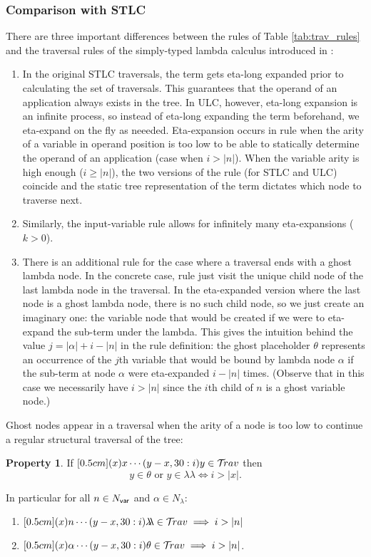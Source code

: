 \documentclass{article}
\theoremstyle{definition}
\newtheorem{property}{Property}[section]
\newcommand\NodesVar{N_{\sf var}}%
\newcommand\NodesLmd{N_\lambda}%
\newcommand{\ghostlmd}{{\lambda\!\!\lambda}}
\newcommand{\ghostvar}{\theta}
\begin{document}
\subsubsection{Comparison with STLC}
There are three important differences between the rules of Table \ref{tab:trav_rules} and the traversal rules of the simply-typed lambda calculus introduced in \cite{Blum2006}:
\begin{enumerate}
  \item In the original STLC traversals, the term gets eta-long expanded prior to calculating the set of traversals. This guarantees that the operand of an application always exists in the tree. In ULC, however, eta-long expansion is an infinite process, so instead of eta-long expanding the term beforehand, we eta-expand on the fly as neeeded. Eta-expansion occurs in rule  when the arity of a variable in operand position is too low to be able to statically determine the operand of an application (case when $i>|n|$). When the variable arity is high enough ($i\geq|n|$), the two versions of the rule (for STLC and ULC) coincide and the static tree representation of the term dictates which node to traverse next.

  \item Similarly, the input-variable rule allows for infinitely many eta-expansions ($k>0$).

  \item There is an additional rule \rulenamet{Lam^\ghostlmd} for the case where a traversal ends with a ghost lambda node. In the concrete case, rule  just visit the unique child node of the last lambda node in the traversal. In the eta-expanded version where the last node is a ghost lambda node, there is no such child node, so we just create an imaginary one: the variable node that would be created if we were to eta-expand the sub-term under the lambda.
      This gives the intuition behind the value $j = |\alpha| + i - |n|$ in the rule definition: the ghost placeholder $\ghostvar$ represents an occurrence of the $j$th variable that would be bound by lambda node $\alpha$ if the sub-term at node $\alpha$ were eta-expanded $i-|n|$ times.
  (Observe that in this case we necessarily have $i>|n|$ since the $i$th child of $n$ is a ghost variable node.)

\end{enumerate}


Ghost nodes appear in a traversal when the arity of a node is too low to continue a regular
structural traversal of the tree:
\begin{property}
If $\Pstr[0.5cm]{(x){x} \cdots (y-x,30:i){y}} \in \travset$ then
$$ y \in \ghostvar \mbox{ or } y \in\ghostlmd \iff i > |x|.$$

In particular for all $n\in\NodesVar$ and $\alpha\in\NodesLmd$:
\begin{enumerate}
\item $\Pstr[0.5cm]{(x){n} \cdots (y-x,30:i){\ghostlmd}} \in \travset \implies i > |n|$
\item $\Pstr[0.5cm]{(x){\alpha} \cdots (y-x,30:i){\ghostvar}} \in \travset \implies i > |n|$.
\end{enumerate}
\end{property}
\end{document}
